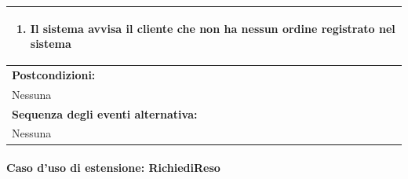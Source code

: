 \begin{center}
\begin{tabular}{ |p{12cm}| }
\begin{enumerate}[nosep, left=0pt]
\begin{enumerate}[nosep, left=0pt]
            \item Il sistema avvisa il cliente che non ha nessun ordine registrato nel sistema
        \end{enumerate}
    \end{enumerate} \\
    \hline
    \textbf{Postcondizioni:} \\
	Nessuna \\
    \hline
    \textbf{Sequenza degli eventi alternativa:} \\
    Nessuna \\
    \hline
\end{tabular}
\end{center}

\newpage
\paragraph{Caso d'uso di estensione: RichiediReso}\mbox{}\\
